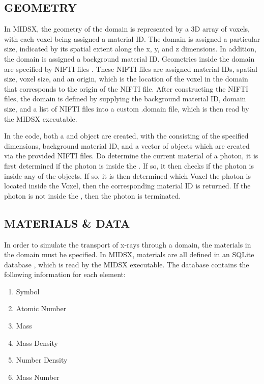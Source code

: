 \subsection{GEOMETRY}
\par In MIDSX, the geometry of the domain is represented by a 3D array of voxels, with each voxel being assigned a material ID. The domain is assigned a particular size, indicated by its spatial extent along the x, y, and z dimensions. In addition, the domain is assigned a background material ID. Geometries inside the domain are specified by NIFTI files \cite{nifti2004}. These NIFTI files are assigned material IDs, spatial size, voxel size, and an origin, which is the location of the voxel in the domain that corresponds to the origin of the NIFTI file. After constructing the NIFTI files, the domain is defined by supplying the background material ID, domain size, and a list of NIFTI files into a custom .domain file, which is then read by the MIDSX executable. \\
\par In the code, both a  and  object are created, with the  consisting of the specified dimensions, background material ID, and a vector of  objects which are created via the provided NIFTI files. Do determine the current material of a photon, it is first determined if the photon is inside the . If so, it then checks if the photon is inside any of the  objects. If so, it is then determined which Voxel the photon is located inside the Voxel, then the corresponding material ID is returned. If the photon is not inside the , then the photon is terminated. \\

\subsection{MATERIALS \& DATA}
\par In order to simulate the transport of x-rays through a domain, the materials in the domain must be specified. In MIDSX, materials are all defined in an SQLite database \cite{sqlite2020hipp}, which is read by the MIDSX executable. The database contains the following information for each element:

\begin{enumerate}
    \item Symbol
    \item Atomic Number
    \item Mass
    \item Mass Density
    \item Number Density
    \item Mass Number
\end{enumerate}


